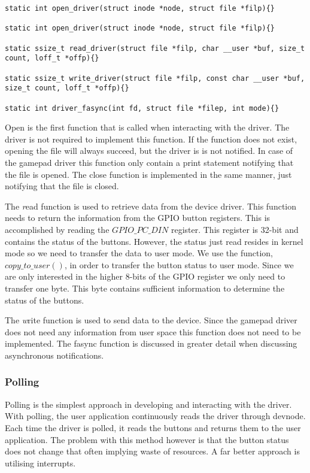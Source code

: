 \begin{lstlisting}[caption=System calls, label=code:func]
static int open_driver(struct inode *node, struct file *filp){}

static int open_driver(struct inode *node, struct file *filp){}

static ssize_t read_driver(struct file *filp, char __user *buf, size_t count, loff_t *offp){}

static ssize_t write_driver(struct file *filp, const char __user *buf, size_t count, loff_t *offp){}

static int driver_fasync(int fd, struct file *filep, int mode){}
\end{lstlisting}




Open is the first function that is called when interacting with the driver. The driver is not required to implement this function. If the function does not exist, opening the file will always succeed, but the driver is is not notified. In case of the gamepad driver this function only contain a print statement notifying that the file is opened. The close function is implemented in the same manner, just notifying that the file is closed. 

The \emph read function is used to retrieve data from the device driver. This function needs to return the information from the GPIO button registers. This is accomplished by reading the $GPIO\_PC\_DIN$ register. This register is 32-bit and contains the status of the buttons. However, the status just read resides in kernel mode so we need to transfer the data to user mode. We use the function, $copy\_to\_user()$, in order to transfer the button status to user mode. Since we are only interested in the higher 8-bits of the GPIO register we only need to transfer one byte. This byte contains sufficient information to determine the status of the buttons. 

The \emph write function is used to send data to the device. Since the gamepad driver does not need any information from user space this function does not need to be implemented. The fasync function is discussed in greater detail when discussing asynchronous notifications. 




\subsubsection{Polling}
Polling is the simplest approach in developing and interacting with the driver. With polling, the user application continuously reads the driver through devnode. Each time the driver is polled, it reads the buttons and returns them to the user application. The problem with this method however is that the button status does not change that often implying waste of resources. A far better approach is utilising interrupts. 


